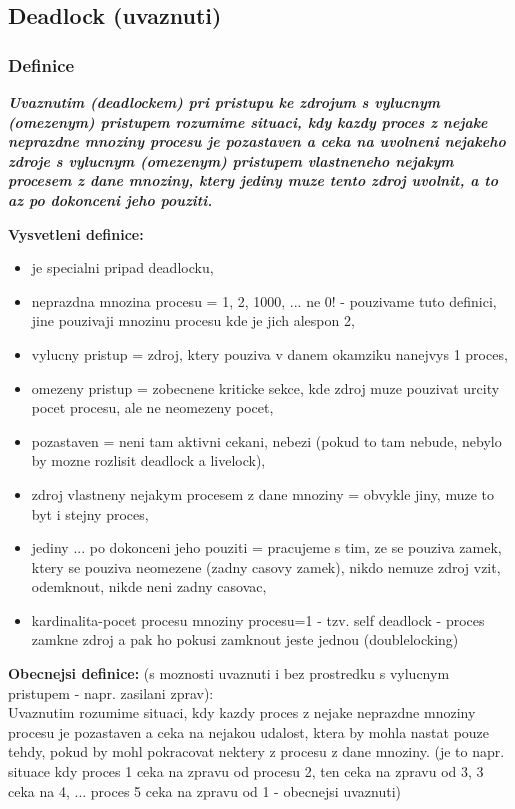 \documentclass[a4paper, 11pt]{article}
\begin{document}
\newpage

\subsection{Deadlock (uvaznuti)}
\subsubsection{Definice}
\textbf{\textit{Uvaznutim (deadlockem) pri pristupu ke zdrojum s vylucnym (omezenym) pristupem rozumime situaci, kdy kazdy proces z nejake neprazdne mnoziny procesu je pozastaven a ceka na uvolneni nejakeho zdroje s vylucnym (omezenym) pristupem vlastneneho nejakym procesem z dane mnoziny, ktery jediny muze tento zdroj uvolnit, a to az po dokonceni jeho pouziti.}}

\textbf{Vysvetleni definice:}
\begin{itemize}
    \item je specialni pripad deadlocku,
    \item neprazdna mnozina procesu = 1, 2, 1000, ... ne 0! - pouzivame tuto definici, jine pouzivaji mnozinu procesu kde je jich alespon 2,
    \item vylucny pristup = zdroj, ktery pouziva v danem okamziku nanejvys 1 proces,
    \item omezeny pristup = zobecnene kriticke sekce, kde zdroj muze pouzivat urcity pocet procesu, ale ne neomezeny pocet,
    \item pozastaven = neni tam aktivni cekani, nebezi (pokud to tam nebude, nebylo by mozne rozlisit deadlock a livelock),
    \item zdroj vlastneny nejakym procesem z dane mnoziny = obvykle jiny, muze to byt i stejny proces,
    \item jediny ... po dokonceni jeho pouziti = pracujeme s tim, ze se pouziva zamek, ktery se pouziva neomezene (zadny casovy zamek), nikdo nemuze zdroj vzit, odemknout, nikde neni zadny casovac,
    \item kardinalita-pocet procesu mnoziny procesu=1 - tzv. self deadlock - proces zamkne zdroj a pak ho pokusi zamknout jeste jednou (doublelocking) \\
\end{itemize}

\textbf{Obecnejsi definice:} (s moznosti uvaznuti i bez prostredku s vylucnym pristupem - napr. zasilani zprav): \\
Uvaznutim rozumime situaci, kdy kazdy proces z nejake neprazdne mnoziny procesu je pozastaven a ceka na nejakou udalost, ktera by mohla nastat pouze tehdy, pokud by mohl pokracovat nektery z procesu z dane mnoziny. (je to napr. situace kdy proces 1 ceka na zpravu od procesu 2, ten ceka na zpravu od 3, 3 ceka na 4, ... proces 5 ceka na zpravu od 1 - obecnejsi uvaznuti)
\end{document}
